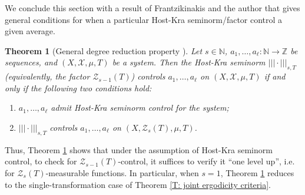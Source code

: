 \documentclass[11pt]{amsart}
\newtheorem{theorem}[lemma]{Theorem}
\theoremstyle{definition}
\newcommand{\N}{{\mathbb N}}
\newcommand{\Z}{{\mathbb Z}}
\newcommand{\CX}{{\mathcal X}}
\newcommand{\CZ}{{\mathcal Z}}
\newcommand{\nnorm}[1]{\lvert\!|\!| #1|\!|\!\rvert}
\newcommand{\1}{{\mathbf{1}}}
\begin{document}

We conclude this section with a result of Frantzikinakis and the author that gives general conditions for when a particular Host-Kra seminorm/factor control a given average.
\begin{theorem}[General degree reduction property {\cite[Theorem 3.11]{FrKu22c}}]\label{T: degree reduction}
Let $s\in\N$, $a_1,\ldots, a_\ell\colon \N\to\Z$ be sequences, and $(X, \CX, \mu, T)$ be a system. Then the Host-Kra seminorm $\nnorm{\cdot}_{s,T}$ (equivalently, the factor $\CZ_{s-1}(T)$) controls $a_1, \ldots, a_\ell$ on $(X, \CX, \mu, T)$ if and only if the following two conditions hold:
\begin{enumerate}
    \item $a_1, \ldots, a_\ell$ admit Host-Kra seminorm control for the system;
    \item $\nnorm{\cdot}_{s,T}$ controls $a_1, \ldots, a_\ell$ on $(X, \CZ_s(T), \mu, T)$.
\end{enumerate}
\end{theorem}
Thus, Theorem \ref{T: degree reduction} shows that under the assumption of Host-Kra seminorm control, to check for $\CZ_{s-1}(T)$-control, it suffices to verify it ``one level up'', i.e. for $\CZ_{s}(T)$-measurable functions. In particular, when $s=1$, Theorem \ref{T: degree reduction} reduces to the single-transformation case of Theorem \ref{T: joint ergodicity criteria}. 
\end{document}
